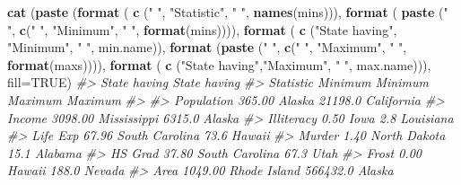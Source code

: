 \documentclass[
]{book}
\newenvironment{Shaded}{\begin{snugshade}}{\end{snugshade}}
\newcommand{\AttributeTok}[1]{\textcolor[rgb]{0.13,0.29,0.53}{#1}}
\newcommand{\CommentTok}[1]{\textcolor[rgb]{0.56,0.35,0.01}{\textit{#1}}}
\newcommand{\ConstantTok}[1]{\textcolor[rgb]{0.56,0.35,0.01}{#1}}
\newcommand{\FunctionTok}[1]{\textcolor[rgb]{0.13,0.29,0.53}{\textbf{#1}}}
\newcommand{\NormalTok}[1]{#1}
\newcommand{\StringTok}[1]{\textcolor[rgb]{0.31,0.60,0.02}{#1}}
\begin{document}
\begin{Shaded}
\begin{Highlighting}[]
\FunctionTok{cat}\NormalTok{ (}\FunctionTok{paste}\NormalTok{ (}\FunctionTok{format}\NormalTok{ (    }\FunctionTok{c}\NormalTok{  (}\StringTok{" "}\NormalTok{, }\StringTok{"Statistic"}\NormalTok{, }\StringTok{" "}\NormalTok{, }\FunctionTok{names}\NormalTok{(mins))),}
            \FunctionTok{format}\NormalTok{ ( }\FunctionTok{paste}\NormalTok{ (}\StringTok{"  "}\NormalTok{, }\FunctionTok{c}\NormalTok{(}\StringTok{"  "}\NormalTok{, }\StringTok{"Minimum"}\NormalTok{, }\StringTok{" "}\NormalTok{, }\FunctionTok{format}\NormalTok{(mins)))),}
            \FunctionTok{format}\NormalTok{ (    }\FunctionTok{c}\NormalTok{  (}\StringTok{"State having"}\NormalTok{, }\StringTok{"Minimum"}\NormalTok{, }\StringTok{" "}\NormalTok{, min.name)),}
            \FunctionTok{format}\NormalTok{ (}\FunctionTok{paste}\NormalTok{  (}\StringTok{"       "}\NormalTok{, }\FunctionTok{c}\NormalTok{(}\StringTok{" "}\NormalTok{, }\StringTok{"Maximum"}\NormalTok{, }\StringTok{" "}\NormalTok{, }\FunctionTok{format}\NormalTok{(maxs)))),}
            \FunctionTok{format}\NormalTok{ (    }\FunctionTok{c}\NormalTok{  (}\StringTok{"State having"}\NormalTok{,}\StringTok{"Maximum"}\NormalTok{, }\StringTok{" "}\NormalTok{, max.name))), }
              \AttributeTok{fill=}\ConstantTok{TRUE}\NormalTok{)}
\CommentTok{\#\textgreater{}                       State having                    State having }
\CommentTok{\#\textgreater{} Statistic     Minimum Minimum                Maximum  Maximum      }
\CommentTok{\#\textgreater{}                                                                    }
\CommentTok{\#\textgreater{} Population     365.00 Alaska                  21198.0 California   }
\CommentTok{\#\textgreater{} Income        3098.00 Mississippi              6315.0 Alaska       }
\CommentTok{\#\textgreater{} Illiteracy       0.50 Iowa                        2.8 Louisiana    }
\CommentTok{\#\textgreater{} Life Exp        67.96 South Carolina             73.6 Hawaii       }
\CommentTok{\#\textgreater{} Murder           1.40 North Dakota               15.1 Alabama      }
\CommentTok{\#\textgreater{} HS Grad         37.80 South Carolina             67.3 Utah         }
\CommentTok{\#\textgreater{} Frost            0.00 Hawaii                    188.0 Nevada       }
\CommentTok{\#\textgreater{} Area          1049.00 Rhode Island           566432.0 Alaska}
\end{Highlighting}
\end{Shaded}
\end{document}
